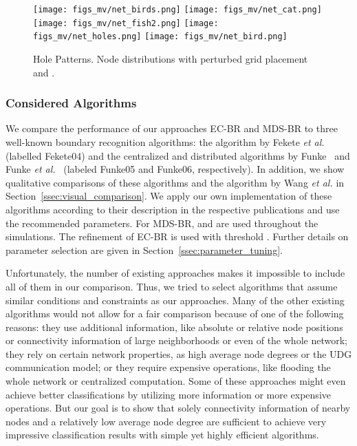 \documentclass{llncs}
\begin{document}
\begin{figure}[b]
	\small
	\centering
	\texttt{[image: figs\_mv/net\_birds.png]}
	\texttt{[image: figs\_mv/net\_cat.png]}
	\texttt{[image: figs\_mv/net\_fish2.png]}
	\texttt{[image: figs\_mv/net\_holes.png]}
	\texttt{[image: figs\_mv/net\_bird.png]}
	\caption{Hole Patterns. Node distributions with perturbed grid placement and .\label{fig:nets}}
\end{figure}


\subsubsection{Considered Algorithms}
We compare the performance of our approaches EC-BR and MDS-BR to three well-known boundary recognition algorithms: the algorithm by Fekete \emph{et al.} \cite{fkpfb04} (labelled Fekete04) and the centralized and distributed algorithms by Funke~\cite{f05} and Funke \emph{et al.}~\cite{fk06} (labeled Funke05 and Funke06, respectively).
In addition, we show qualitative comparisons of these algorithms and the algorithm by Wang \emph{et al.} \cite{wgm06} in Section~\ref{ssec:visual_comparison}.
We apply our own implementation of these algorithms according to their description in the respective publications and use the recommended parameters.
For MDS-BR,  and  are used throughout the simulations.
The refinement of EC-BR is used with threshold .
Further details on parameter selection are given in Section~\ref{ssec:parameter_tuning}.

Unfortunately, the number of existing approaches makes it impossible to include all of them in our comparison.
Thus, we tried to select algorithms that assume similar conditions and constraints as our approaches.
Many of the other existing algorithms would not allow for a fair comparison because of one of the following reasons:
they use additional information, like absolute or relative node positions or connectivity information of large neighborhoods or even of the whole network;
they rely on certain network properties, as high average node degrees or the UDG communication model;
or they require expensive operations, like flooding the whole network or centralized computation.
Some of these approaches might even achieve better classifications by utilizing more information or more expensive operations.
But our goal is to show that solely connectivity information of nearby nodes and a relatively low average node degree are sufficient to achieve very impressive classification results with simple yet highly efficient algorithms.
\end{document}
